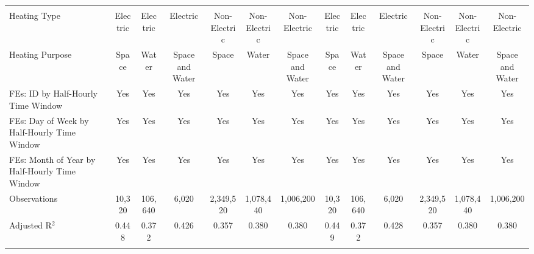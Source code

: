 \begin{table}[!htbp]
\begin{tabular}{@{\extracolsep{20pt}}lcccccccccccc}
  & & & & & & & & & & & & \\ 
\hline \\[-1.8ex] 
Heating Type & Electric & Electric & Electric & Non-Electric & Non-Electric & Non-Electric & Electric & Electric & Electric & Non-Electric & Non-Electric & Non-Electric \\ 
Heating Purpose & Space & Water & Space and Water & Space & Water & Space and Water & Space & Water & Space and Water & Space & Water & Space and Water \\ 
FEs: ID by Half-Hourly Time Window & Yes & Yes & Yes & Yes & Yes & Yes & Yes & Yes & Yes & Yes & Yes & Yes \\ 
FEs: Day of Week by Half-Hourly Time Window & Yes & Yes & Yes & Yes & Yes & Yes & Yes & Yes & Yes & Yes & Yes & Yes \\ 
FEs: Month of Year by Half-Hourly Time Window & Yes & Yes & Yes & Yes & Yes & Yes & Yes & Yes & Yes & Yes & Yes & Yes \\ 
Observations & 10,320 & 106,640 & 6,020 & 2,349,520 & 1,078,440 & 1,006,200 & 10,320 & 106,640 & 6,020 & 2,349,520 & 1,078,440 & 1,006,200 \\ 
Adjusted R$^{2}$ & 0.448 & 0.372 & 0.426 & 0.357 & 0.380 & 0.380 & 0.449 & 0.372 & 0.428 & 0.357 & 0.380 & 0.380 \\ 
\hline 
\hline \\[-1.8ex] 
\end{tabular} 
\end{table} 
